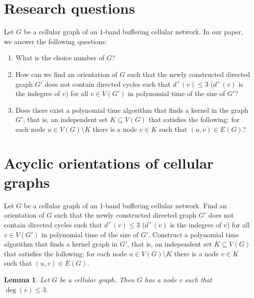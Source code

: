 \documentclass[letterpaper, 10 pt, conference]{ieeeconf}  %
\newtheorem{lem}{Lemma}
\begin{document}
\section{Research questions}\label{sec:problem-questions}
Let $G$ be a cellular graph of an $1$-band buffering cellular network. In our paper, we answer the following questions:
\begin{enumerate}
\item What is the choice number of $G$?
\item How can we find an orientation of $G$ such that the newly constructed directed graph $G'$ does not contain directed cycles such that $d^+(v) \leqslant 3$ ($d^+(v)$ is the indegree of $v$) for all $v \in V(G')$ in polynomial time of the size of $G'$?
\item Does there exist a polynomial time algorithm that finds a kernel in the graph $G'$, that is, an independent set $K \subseteq V(G)$ that satisfies the following: for each node $u \in V(G) \setminus K$ there is a node $v \in K$ such that $(u,v) \in E(G)$?
\end{enumerate}
\section{Acyclic orientations of cellular graphs}\label{sec:orientation}

Let $G$ be a cellular graph of an $1$-band buffering cellular network. Find an orientation of $G$ such that the newly constructed directed graph $G'$ does not contain directed cycles such that $d^+(v) \leqslant 3$ ($d^+(v)$ is the indegree of $v$) for all $v \in V(G')$ in polynomial time of the size of $G'$. Construct a polynomial time algorithm that finds a kernel graph in $G'$, that is, an independent set $K \subseteq V(G)$ that satisfies the following: for each node $u \in V(G) \setminus K$ there is a node $v \in K$ such that $(u,v) \in E(G)$.


\begin{lem}\label{lem:degree-constraint}
Let $G$ be a cellular graph. Then $G$ has a node $v$ such that $\deg(v) \leqslant 3$.
\end{lem}
\end{document}
